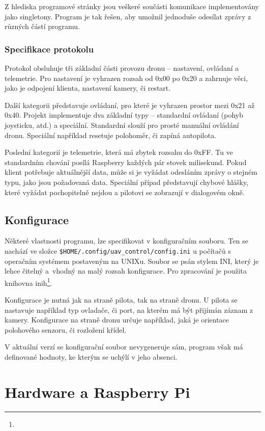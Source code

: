 \documentclass[a4paper,oneside,12pt]{report}
\begin{document}
Z hlediska programové stránky jsou veškeré součásti komunikace implementovány jako singletony.
Program je tak řešen, aby umožnil jednoduše odesílat zprávy z různých částí programu.

\subsection{Specifikace protokolu}

Protokol obsluhuje tři základní části provozu dronu -- nastavení, ovládaní a telemetrie.
Pro nastavení je vyhrazen rozsah od 0x00 po 0x20 a zahrnuje věci, jako je odpojení klienta, nastavení kamery, či restart.

Další kategorii představuje ovládaní, pro které je vyhrazen prostor mezi 0x21 až 0x40.
Projekt implementuje dva základní typy -- standardní ovládaní (pohyb joysticku, atd.) a speciální.
Standardní slouží pro prosté manuální ovládání dronu.
Speciální například resetuje polohoměr, či zapíná autopilota.

Poslední kategorií je telemetrie, která má zbytek rozsahu do 0xFF.
Tu ve standardním chování posílá Raspberry každých pár stovek milisekund.
Pokud klient potřebuje aktuálnější data, může si je vyžádat odesláním zprávy o stejném typu, jako jsou požadovaná data.
Speciální případ představují chybové hlášky, které vyžádat pochopitelně nejdou a pilotovi se zobrazují v dialogovém okně.

\section{Konfigurace}

Některé vlastnosti programu, lze specifikovat v konfiguračním souboru.
Ten se nachází ve složce \verb|$HOME/.config/uav_control/config.ini| u počítačů s operačním systémem postaveným na UNIXu.
Soubor se psán stylem INI, který je lehce čitelný a~vhodný na malý rozsah konfigurace.
Pro zpracování je použita knihovna inih\footnote{}.


Konfigurace je nutná jak na straně pilota, tak na straně dronu.
U pilota se nastavuje například typ ovladače, či port, na kterém má být přijímán záznam z kamery.
Konfigurace na straně dronu určuje například, jaká je orientace polohového senzoru, či rozložení křídel.

V aktuální verzí se konfigurační soubor nevygeneruje sám, program však má definované hodnoty, ke kterým se uchýlí v jeho absenci.


\chapter{Hardware a Raspberry Pi}
\end{document}
